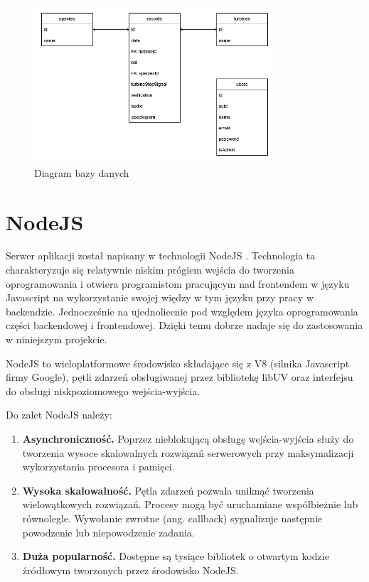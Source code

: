 \documentclass{sprz}
\begin{document}
\begin{figure}[h]
  \centering
  \includegraphics[width=0.8\textwidth]{sprz/db_diagram}
  \caption{Diagram bazy danych}
  \label{img:db_diagram}
\end{figure}

\section{NodeJS}

Serwer aplikacji został napisany w technologii NodeJS \cite{nodejs}. Technologia ta charakteryzuje się relatywnie niskim prógiem wejścia do tworzenia oprogramowania i otwiera programistom pracującym nad frontendem w języku Javascript na wykorzystanie swojej więdzy w tym języku przy pracy w backendzie. Jednocześnie na ujednolicenie pod względem języka oprogramowania części backendowej i frontendowej. Dzięki temu dobrze nadaje się do zastosowania w niniejszym projekcie.

NodeJS to wieloplatformowe środowisko składające się z V8 (silnika Javascript firmy Google), pętli zdarzeń obsługiwanej przez bibliotekę libUV oraz interfejsu do obsługi niskpoziomowego wejścia-wyjścia.

Do zalet NodeJS należy:
\begin{enumerate}
  \item \textbf{Asynchroniczność.} Poprzez nieblokującą obsługę wejścia-wyjścia służy do tworzenia wysoce skalowalnych rozwiązań serwerowych przy maksymalizacji wykorzystania procesora i pamięci.
  \item \textbf{Wysoka skalowalność.} Pętla zdarzeń pozwala uniknąć tworzenia wielowątkowych rozwiązań. Procesy mogą być uruchamiane współbieżnie lub równolegle. Wywołanie zwrotne (ang. callback) sygnalizuje następnie powodzenie lub niepowodzenie zadania.
  \item \textbf{Duża popularność.} Dostępne są tysiące bibliotek o otwartym kodzie źródłowym tworzonych przez środowisko NodeJS.
\end{enumerate}
\end{document}
